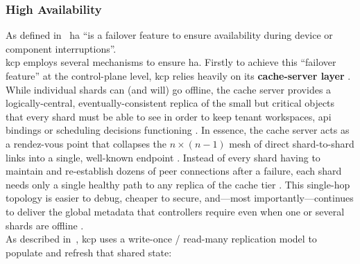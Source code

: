 \documentclass[11pt, a4paper, oneside, listof=totoc]{scrartcl}
\begin{document}
            \subsubsection{High Availability}\label{subsubsec:highAvailability}
                As defined in~\cite[p.~3-3]{nist800-113} \gls{ha} \enquote{is a failover feature to
                ensure availability during device or component interruptions}.
                \\
                \gls{kcp} employs several mechanisms to ensure \gls{ha}.
                Firstly to achieve this “failover feature” at the control-plane level, \gls{kcp}
                relies heavily on its \textbf{cache-server layer}
                \parencite{kcpShardingCacheServer}.
                While individual shards can (and will) go offline, the cache server provides a
                logically-central, eventually-consistent replica of the small but critical objects
                that every shard must be able to see in order to keep tenant workspaces, \gls{api}
                bindings or scheduling decisions functioning \parencite{kcpShardingCacheServer}.
                In essence, the cache server acts as a rendez-vous point that collapses the
                \( n \times (n - 1) \) mesh of direct shard-to-shard links into a single, well-known
                endpoint \parencite{kcpShardingCacheServer}.
                Instead of every shard having to maintain and re-establish dozens of peer
                connections after a failure, each shard needs only a single healthy path to any
                replica of the cache tier \parencite{kcpShardingCacheServer}.
                This single-hop topology is easier to debug, cheaper to secure, and—most
                importantly—continues to deliver the global metadata that controllers require even
                when one or several shards are offline \parencite{kcpShardingCacheServer}.
                \\
                As described in~\cite{kcpShardingCacheServer}, \gls{kcp} uses a write-once /
                read-many replication model to populate and refresh that shared state:
\end{document}
